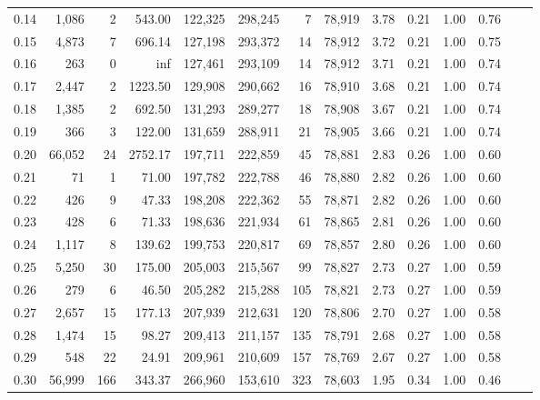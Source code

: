 \begin{tabular}{rrrrrrrrrrrrrr}
0.14 &   1,086 &       2 &    543.00 &  122,325 &  298,245 &       7 &  78,919 &  3.78 &  0.21 &  1.00 &      0.76 \\
0.15 &   4,873 &       7 &    696.14 &  127,198 &  293,372 &      14 &  78,912 &  3.72 &  0.21 &  1.00 &      0.75 \\
0.16 &     263 &       0 &       inf &  127,461 &  293,109 &      14 &  78,912 &  3.71 &  0.21 &  1.00 &      0.74 \\
0.17 &   2,447 &       2 &   1223.50 &  129,908 &  290,662 &      16 &  78,910 &  3.68 &  0.21 &  1.00 &      0.74 \\
0.18 &   1,385 &       2 &    692.50 &  131,293 &  289,277 &      18 &  78,908 &  3.67 &  0.21 &  1.00 &      0.74 \\
0.19 &     366 &       3 &    122.00 &  131,659 &  288,911 &      21 &  78,905 &  3.66 &  0.21 &  1.00 &      0.74 \\
0.20 &  66,052 &      24 &   2752.17 &  197,711 &  222,859 &      45 &  78,881 &  2.83 &  0.26 &  1.00 &      0.60 \\
0.21 &      71 &       1 &     71.00 &  197,782 &  222,788 &      46 &  78,880 &  2.82 &  0.26 &  1.00 &      0.60 \\
0.22 &     426 &       9 &     47.33 &  198,208 &  222,362 &      55 &  78,871 &  2.82 &  0.26 &  1.00 &      0.60 \\
0.23 &     428 &       6 &     71.33 &  198,636 &  221,934 &      61 &  78,865 &  2.81 &  0.26 &  1.00 &      0.60 \\
0.24 &   1,117 &       8 &    139.62 &  199,753 &  220,817 &      69 &  78,857 &  2.80 &  0.26 &  1.00 &      0.60 \\
0.25 &   5,250 &      30 &    175.00 &  205,003 &  215,567 &      99 &  78,827 &  2.73 &  0.27 &  1.00 &      0.59 \\
0.26 &     279 &       6 &     46.50 &  205,282 &  215,288 &     105 &  78,821 &  2.73 &  0.27 &  1.00 &      0.59 \\
0.27 &   2,657 &      15 &    177.13 &  207,939 &  212,631 &     120 &  78,806 &  2.70 &  0.27 &  1.00 &      0.58 \\
0.28 &   1,474 &      15 &     98.27 &  209,413 &  211,157 &     135 &  78,791 &  2.68 &  0.27 &  1.00 &      0.58 \\
0.29 &     548 &      22 &     24.91 &  209,961 &  210,609 &     157 &  78,769 &  2.67 &  0.27 &  1.00 &      0.58 \\
0.30 &  56,999 &     166 &    343.37 &  266,960 &  153,610 &     323 &  78,603 &  1.95 &  0.34 &  1.00 &      0.46 \\

\end{tabular}
